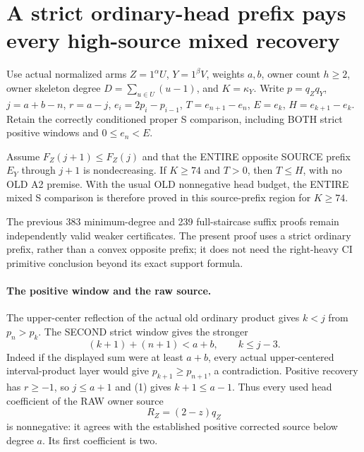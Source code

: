 \section{A strict ordinary-head prefix pays every high-source mixed recovery}
Use actual normalized arms $Z=1^\alpha U$, $Y=1^\beta V$, weights
$a,b$, owner count $h\ge2$, owner skeleton degree
$D=\sum_{u\in U}(u-1)$, and $K=\kappa_Y$.  Write
$p=q_Zq_Y$, $j=a+b-n$, $r=a-j$, $e_i=2p_i-p_{i-1}$,
$T=e_{n+1}-e_n$, $E=e_k$, $H=e_{k+1}-e_k$.
Retain the correctly conditioned proper S comparison, including BOTH
strict positive windows and $0\le e_n<E$.

\begin{theorem}
Assume $F_Z(j+1)\le F_Z(j)$ and that the ENTIRE opposite SOURCE
prefix $E_Y$ through $j+1$ is nondecreasing.  If $K\ge74$ and $T>0$,
then $T\le H$, with no OLD A2 premise.  With the usual OLD
nonnegative head budget, the ENTIRE mixed S comparison is therefore
proved in this source-prefix region for $K\ge74$.

The previous 383 minimum-degree and 239 full-staircase suffix proofs
remain independently valid weaker certificates.  The present proof
uses a strict ordinary prefix, rather than a convex opposite prefix;
it does not need the right-heavy CI primitive conclusion beyond its
exact support formula.
\end{theorem}

\paragraph{The positive window and the raw source.}
The upper-center reflection of the actual old ordinary product gives
$k<j$ from $p_n>p_k$.  The SECOND strict window gives the stronger
\[
 (k+1)+(n+1)<a+b,\qquad k\le j-3.                    \tag{1}
\]
Indeed if the displayed sum were at least $a+b$, every actual
upper-centered interval-product layer would give
$p_{k+1}\ge p_{n+1}$, a contradiction.
Positive recovery has $r\ge-1$, so $j\le a+1$ and (1) gives
$k+1\le a-1$.  Thus every used head coefficient of the RAW owner
source
\[
                         R_Z=(2-z)q_Z
\]
is nonnegative: it agrees with the established positive corrected
source below degree $a$.  Its first coefficient is two.

